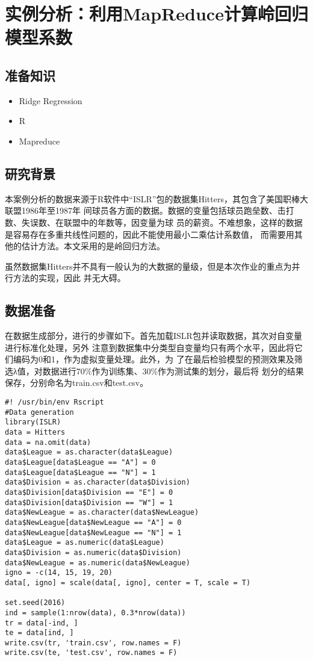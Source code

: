 \section{实例分析：利用MapReduce计算岭回归模型系数}\label{ux5b9eux4f8bux5206ux6790ux5229ux7528mapreduceux8ba1ux7b97ux5cadux56deux5f52ux6a21ux578bux7cfbux6570}

\subsection{准备知识}\label{ux51c6ux5907ux77e5ux8bc6}

\begin{itemize}
\itemsep1pt\parskip0pt
\item
  Ridge Regression
\item
  R
\item
  Mapreduce
\end{itemize}

\subsection{研究背景}\label{ux7814ux7a76ux80ccux666f}

本案例分析的数据来源于R软件中``ISLR''包的数据集Hitters，其包含了美国职棒大联盟1986年至1987年
间球员各方面的数据。数据的变量包括球员跑垒数、击打数、失误数、在联盟中的年数等，因变量为球
员的薪资。不难想象，这样的数据是容易存在多重共线性问题的，因此不能使用最小二乘估计系数值，
而需要用其他的估计方法。本文采用的是岭回归方法。

虽然数据集Hitters并不具有一般认为的大数据的量级，但是本次作业的重点为并行方法的实现，因此
并无大碍。

\subsection{数据准备}\label{ux6570ux636eux51c6ux5907}

在数据生成部分，进行的步骤如下。首先加载ISLR包并读取数据，其次对自变量进行标准化处理，另外
注意到数据集中分类型自变量均只有两个水平，因此将它们编码为0和1，作为虚拟变量处理。此外，为
了在最后检验模型的预测效果及筛选λ值，对数据进行70\%作为训练集、30\%作为测试集的划分，最后将
划分的结果保存，分别命名为train.csv和test.csv。

\begin{lstlisting}
#! /usr/bin/env Rscript
#Data generation
library(ISLR)
data = Hitters
data = na.omit(data)
data$League = as.character(data$League)
data$League[data$League == "A"] = 0
data$League[data$League == "N"] = 1
data$Division = as.character(data$Division)
data$Division[data$Division == "E"] = 0
data$Division[data$Division == "W"] = 1
data$NewLeague = as.character(data$NewLeague)
data$NewLeague[data$NewLeague == "A"] = 0
data$NewLeague[data$NewLeague == "N"] = 1
data$League = as.numeric(data$League)
data$Division = as.numeric(data$Division)
data$NewLeague = as.numeric(data$NewLeague)
igno = -c(14, 15, 19, 20)
data[, igno] = scale(data[, igno], center = T, scale = T)

set.seed(2016)
ind = sample(1:nrow(data), 0.3*nrow(data))
tr = data[-ind, ]
te = data[ind, ]
write.csv(tr, 'train.csv', row.names = F)
write.csv(te, 'test.csv', row.names = F)
\end{lstlisting}

